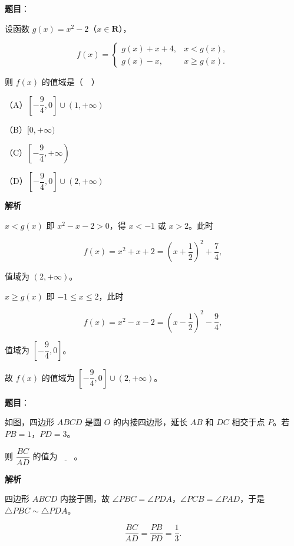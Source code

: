 \begin{answer}

\textbf{题目}：

设函数 $g(x)=x^2-2$（$x\in\mathbf R$），

\nopagebreak[4]
\[f(x)=\begin{cases}g(x)+x+4,&x<g(x),\\ g(x)-x,&x\geqslant g(x).\end{cases}\]

则 $f(x)$ 的值域是（　）

（A）$\left[-\dfrac94,0\right]\cup(1,+\infty)$

（B）$[0,+\infty)$

（C）$\left[-\dfrac94,+\infty\right)$

（D）$\left[-\dfrac94,0\right]\cup(2,+\infty)$

\textbf{解析}

$x<g(x)$ 即 $x^2-x-2>0$，得 $x<-1$ 或 $x>2$。此时

\nopagebreak[4]
\[f(x)=x^2+x+2=\left(x+\frac12\right)^2+\frac74,\]

值域为 $(2,+\infty)$。

$x\geqslant g(x)$ 即 $-1\leqslant x\leqslant2$，此时

\nopagebreak[4]
\[f(x)=x^2-x-2=\left(x-\frac12\right)^2-\frac94,\]

值域为 $\left[-\dfrac94,0\right]$。

故 $f(x)$ 的值域为 $\left[-\dfrac94,0\right]\cup(2,+\infty)$。


\end{answer}
\begin{answer}

\textbf{题目}：

如图，四边形 $ABCD$ 是圆 $O$ 的内接四边形，延长 $AB$ 和 $DC$ 相交于点 $P$。若 $PB=1$，$PD=3$。

则 $\dfrac{BC}{AD}$ 的值为$\underline{\qquad}$。
\nopagebreak[4]
\begin{center}\end{center}
\nopagebreak[4]
\textbf{解析}

四边形 $ABCD$ 内接于圆，故 $\angle PBC=\angle PDA$，$\angle PCB=\angle PAD$，于是 $\triangle PBC\sim\triangle PDA$。

\nopagebreak[4]
\[\frac{BC}{AD}=\frac{PB}{PD}=\frac13.\]


\end{answer}

